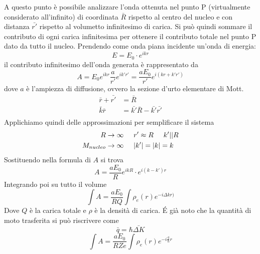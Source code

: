 A questo punto è possibile analizzare l'onda ottenuta nel punto P (virtualmente considerato all'infinito) di coordinata $\bar{R}$ rispetto al centro del nucleo e con distanza $\bar{r'}$ rispetto al volumetto infinitesimo di carica.
Si può quindi sommare il contributo di ogni carica infinitesima per ottenere il contributo totale nel punto P dato da tutto il nucleo.
Prendendo come onda piana incidente un'onda di energia:
\begin{equation}
E=E_0\cdot e^{ikr}
\end{equation}
il contributo infinitesimo dell'onda generata è rappresentato da
\begin{equation}
A=E_0 e^{ikr}\frac{a}{r'}e^{ik'r'}=\frac{aE_0}{r'}e^{i(kr+k'r')}
\end{equation}
dove $a$ è l'ampiezza di diffusione, ovvero la sezione d'urto elementare di Mott.
\begin{equation}
\begin{split}
\bar{r}+\bar{r'}&=\bar{R}\\
\bar{k}\bar{r}&=\bar{k'}\bar{R}-\bar{k'}\bar{r'}\\
\end{split}
\end{equation}
Applichiamo quindi delle approssimazioni per semplificare il sistema
\begin{equation}
\begin{split}
R\to\infty &\hspace{0.5cm}r'\approx R\hspace{0.5cm}k'||R\\
M_{nucleo}\to\infty &\hspace{0.5cm}|k'|=|k|=k
\end{split}
\end{equation}
Sostituendo nella formula di $A$ si trova
\begin{equation}
A=\frac{aE_0}{R}e^{ikR}\cdot e^{i(k-k')r}
\end{equation}
Integrando poi su tutto il volume
\begin{equation}
\int A=\frac{aE_0}{RQ}\int \rho_e(r)e^{-i\Delta kr)}
\end{equation}
Dove $Q$ è la carica totale e $\rho$ è la densità di carica.
\'E già noto che la quantità di moto trasferita si può riscrivere come
\begin{equation}
\bar{q}=\hbar \bar{\Delta K}
\end{equation}
\begin{equation}
\int A=\frac{aE_0}{RZe}\int \rho_e(r)e^{-i\frac{q}{\hbar}r}
\end{equation}
